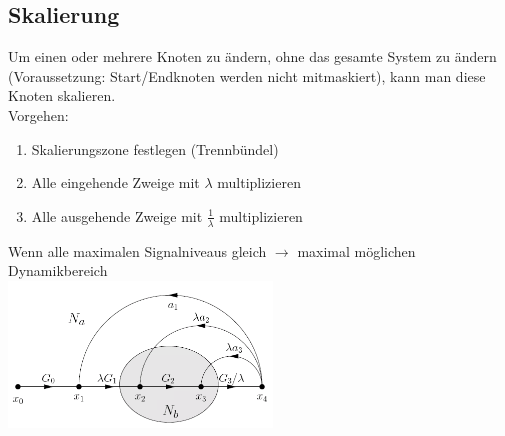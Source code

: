 \subsection{Skalierung}
	Um einen oder mehrere Knoten zu ändern, ohne das gesamte System zu
	ändern (Voraussetzung: Start/Endknoten werden nicht mitmaskiert), kann man
	diese Knoten skalieren.\\
	Vorgehen: 
	\begin{enumerate}
                \item Skalierungszone festlegen (Trennbündel)
                \item Alle eingehende Zweige mit $\lambda$ multiplizieren
                \item Alle ausgehende Zweige mit $\frac{1}{\lambda}$
                multiplizieren
    \end{enumerate}
    Wenn alle maximalen Signalniveaus gleich $\rightarrow$ maximal möglichen
    Dynamikbereich\\
    \includegraphics[width=7cm]{./images/sfd-scalierung.png}
    

